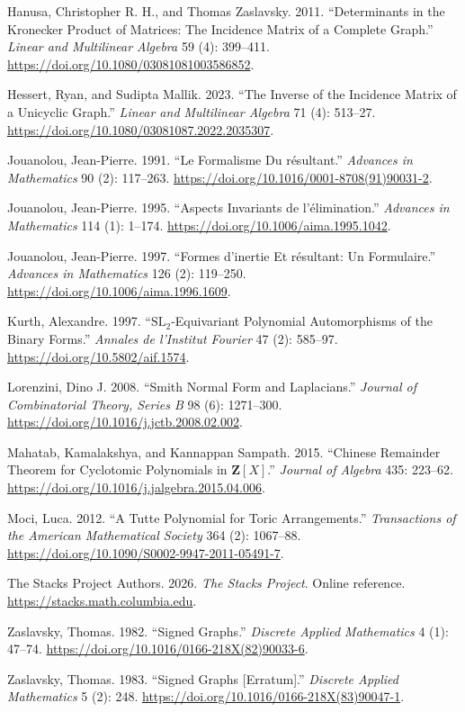 \documentclass[
  11pt,
  a4paper,
]{article}
\newlength{\cslhangindent}
\newenvironment{CSLReferences}[2] %
 {\begin{list}{}{%
  \setlength{\itemindent}{0pt}
  \setlength{\leftmargin}{0pt}
  \setlength{\parsep}{0pt}
  \ifodd #1
   \setlength{\leftmargin}{\cslhangindent}
   \setlength{\itemindent}{-1\cslhangindent}
  \fi
  \setlength{\itemsep}{#2\baselineskip}}}
 {\end{list}}
\begin{document}
\begin{CSLReferences}{1}{1}
Hanusa, Christopher R. H., and Thomas Zaslavsky. 2011. {``Determinants
in the {K}ronecker Product of Matrices: The Incidence Matrix of a
Complete Graph.''} \emph{Linear and Multilinear Algebra} 59 (4):
399--411. \url{https://doi.org/10.1080/03081081003586852}.

Hessert, Ryan, and Sudipta Mallik. 2023. {``The Inverse of the Incidence
Matrix of a Unicyclic Graph.''} \emph{Linear and Multilinear Algebra} 71
(4): 513--27. \url{https://doi.org/10.1080/03081087.2022.2035307}.

Jouanolou, Jean-Pierre. 1991. {``Le Formalisme Du r{é}sultant.''}
\emph{Advances in Mathematics} 90 (2): 117--263.
\url{https://doi.org/10.1016/0001-8708(91)90031-2}.

Jouanolou, Jean-Pierre. 1995. {``Aspects Invariants de
l'{é}limination.''} \emph{Advances in Mathematics} 114 (1): 1--174.
\url{https://doi.org/10.1006/aima.1995.1042}.

Jouanolou, Jean-Pierre. 1997. {``Formes d'inertie Et r{é}sultant: Un
Formulaire.''} \emph{Advances in Mathematics} 126 (2): 119--250.
\url{https://doi.org/10.1006/aima.1996.1609}.

Kurth, Alexandre. 1997. {``{\(\mathrm{SL}_2\)}-Equivariant Polynomial
Automorphisms of the Binary Forms.''} \emph{Annales de l'Institut
Fourier} 47 (2): 585--97. \url{https://doi.org/10.5802/aif.1574}.

Lorenzini, Dino J. 2008. {``Smith Normal Form and Laplacians.''}
\emph{Journal of Combinatorial Theory, Series B} 98 (6): 1271--300.
\url{https://doi.org/10.1016/j.jctb.2008.02.002}.

Mahatab, Kamalakshya, and Kannappan Sampath. 2015. {``Chinese Remainder
Theorem for Cyclotomic Polynomials in {\(\mathbf{Z}[X]\)}.''}
\emph{Journal of Algebra} 435: 223--62.
\url{https://doi.org/10.1016/j.jalgebra.2015.04.006}.

Moci, Luca. 2012. {``A {T}utte Polynomial for Toric Arrangements.''}
\emph{Transactions of the American Mathematical Society} 364 (2):
1067--88. \url{https://doi.org/10.1090/S0002-9947-2011-05491-7}.

The Stacks Project Authors. 2026. \emph{The {Stacks} Project}. Online
reference. \url{https://stacks.math.columbia.edu}.

Zaslavsky, Thomas. 1982. {``Signed Graphs.''} \emph{Discrete Applied
Mathematics} 4 (1): 47--74.
\url{https://doi.org/10.1016/0166-218X(82)90033-6}.

Zaslavsky, Thomas. 1983. {``Signed Graphs {[}Erratum{]}.''}
\emph{Discrete Applied Mathematics} 5 (2): 248.
\url{https://doi.org/10.1016/0166-218X(83)90047-1}.

\end{CSLReferences}
\end{document}

